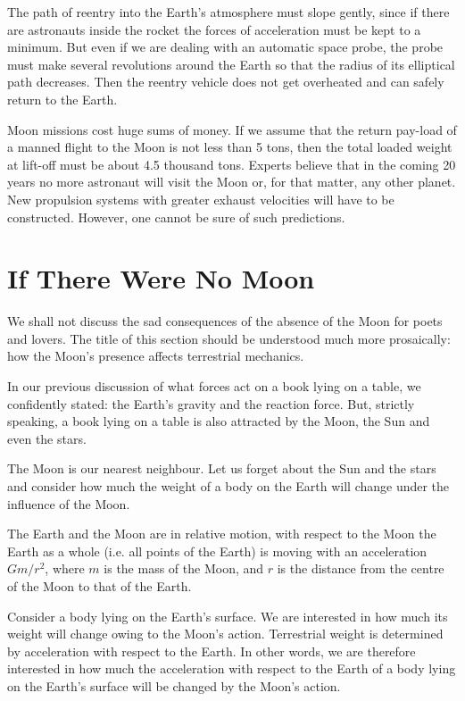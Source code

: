 The path of reentry into the Earth's atmosphere must
slope gently, since if there are astronauts inside the rocket
the forces of acceleration must be kept to a minimum.
But even if we are dealing with an automatic space probe,
the probe must make several revolutions around the
Earth so that the radius of its elliptical path decreases.
Then the reentry vehicle does not get overheated and can
safely return to the Earth.

Moon missions cost huge sums of money. If we assume
that the return pay-load of a manned flight to the Moon
is not less than 5 tons, then the total loaded weight at
lift-off must be about 4.5 thousand tons. Experts believe
that in the coming 20 years no more astronaut will visit
the Moon or, for that matter, any other planet. New
propulsion systems with greater exhaust velocities will
have to be constructed. However, one cannot be sure
of such predictions.

\section{If There Were No Moon}

We shall not discuss the sad consequences of the absence
of the Moon for poets and lovers. The title of this
section should be understood much more prosaically: how
the Moon's presence affects terrestrial mechanics.

In our previous discussion of what forces act on a book
lying on a table, we confidently stated: the Earth's
gravity and the reaction force. But, strictly speaking,
a book lying on a table is also attracted by the Moon,
the Sun and even the stars.

The Moon is our nearest neighbour. Let us forget about
the Sun and the stars and consider how much the weight
of a body on the Earth will change under the influence of
the Moon.

The Earth and the Moon are in relative motion, with
respect to the Moon the Earth as a whole (i.e. all points
of the Earth) is moving with an acceleration $Gm/r^{2}$,
where $m$ is the mass of the Moon, and $r$ is the distance
from the centre of the Moon to that of the Earth.

Consider a body lying on the Earth's surface. We are
interested in how much its weight will change owing
to the Moon's action. Terrestrial weight is determined
by acceleration with respect to the Earth. In other words,
we are therefore interested in how much the acceleration
with respect to the Earth of a body lying on the Earth's
surface will be changed by the Moon's action.

